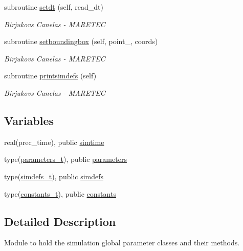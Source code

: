 \begin{DoxyCompactItemize}
subroutine \mbox{\hyperlink{namespacesimulation__globals_a3ef0462db5a60ac79304cabd2fdd914d}{setdt}} (self, read\+\_\+dt)
\begin{DoxyCompactList}\small\item\em Birjukovs Canelas -\/ M\+A\+R\+E\+T\+EC \end{DoxyCompactList}\item 
subroutine \mbox{\hyperlink{namespacesimulation__globals_a1fc4653684d73efecdbd140b6cafe541}{setboundingbox}} (self, point\+\_\+, coords)
\begin{DoxyCompactList}\small\item\em Birjukovs Canelas -\/ M\+A\+R\+E\+T\+EC \end{DoxyCompactList}\item 
subroutine \mbox{\hyperlink{namespacesimulation__globals_ad90d6959da1d43e2cd1febff82187ed5}{printsimdefs}} (self)
\begin{DoxyCompactList}\small\item\em Birjukovs Canelas -\/ M\+A\+R\+E\+T\+EC \end{DoxyCompactList}\end{DoxyCompactItemize}
\subsection*{Variables}
\begin{DoxyCompactItemize}
\item 
real(prec\+\_\+time), public \mbox{\hyperlink{namespacesimulation__globals_a10daac198c63b06f99ec0c01b614a352}{simtime}}
\item 
type(\mbox{\hyperlink{structsimulation__globals_1_1parameters__t}{parameters\+\_\+t}}), public \mbox{\hyperlink{namespacesimulation__globals_ac23e87cbb2256792d683ab1bf5dc5e21}{parameters}}
\item 
type(\mbox{\hyperlink{structsimulation__globals_1_1simdefs__t}{simdefs\+\_\+t}}), public \mbox{\hyperlink{namespacesimulation__globals_ae851f977b442737307cd4bb76f2f68be}{simdefs}}
\item 
type(\mbox{\hyperlink{structsimulation__globals_1_1constants__t}{constants\+\_\+t}}), public \mbox{\hyperlink{namespacesimulation__globals_aa3e1a54abbb08d2c09978a3509ec4303}{constants}}
\end{DoxyCompactItemize}


\subsection{Detailed Description}
Module to hold the simulation global parameter classes and their methods. 

